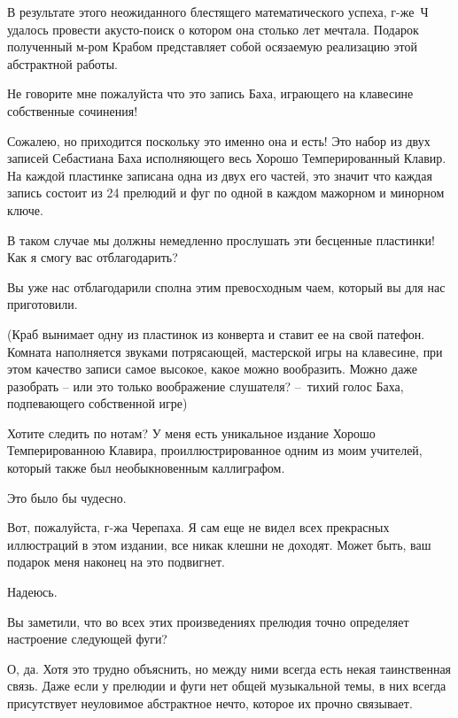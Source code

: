 \documentclass[../main.tex]{subfiles}
\begin{document}
\begin{dialogue}
 В результате этого неожиданного блестящего математического успеха, г-же~Ч удалось провести акусто-поиск о котором она столько лет мечтала. Подарок полученный м-ром Крабом представляет собой осязаемую реализацию этой абстрактной работы.

 Не говорите мне пожалуйста что это запись Баха, играющего на клавесине собственные сочинения!

 Сожалею, но приходится поскольку это именно она и есть! Это набор из двух записей Себастиана Баха исполняющего весь Хорошо Темперированный Клавир. На каждой пластинке записана одна из двух его частей, это значит что каждая запись состоит из 24 прелюдий и фуг по одной в каждом мажорном и минорном ключе.

 В таком случае мы должны немедленно прослушать эти бесценные пластинки! Как я смогу вас отблагодарить?

 Вы уже нас отблагодарили сполна этим превосходным чаем, который вы для нас приготовили.

(Краб вынимает одну из пластинок из конверта и ставит ее на свой патефон. Комната наполняется звуками потрясающей, мастерской игры на клавесине, при этом качество записи самое высокое, какое можно вообразить. Можно даже разобрать \--- или это только воображение слушателя? \---~тихий голос Баха, подпевающего собственной игре)

 Хотите следить по нотам? У меня есть уникальное издание Хорошо Темперированною Клавира, проиллюстрированное одним из моим учителей, который также был необыкновенным каллиграфом.

 Это было бы чудесно.


 Вот, пожалуйста, г-жа Черепаха. Я сам еще не видел всех прекрасных иллюстраций в этом издании, все никак клешни не доходят. Может быть, ваш подарок меня наконец на это подвигнет.

 Надеюсь.

 Вы заметили, что во всех этих произведениях прелюдия точно определяет настроение следующей фуги?

 О, да. Хотя это трудно объяснить, но между ними всегда есть некая таинственная связь. Даже если у прелюдии и фуги нет общей музыкальной темы, в них всегда присутствует неуловимое абстрактное нечто, которое их прочно связывает.


\end{dialogue}
\end{document}
